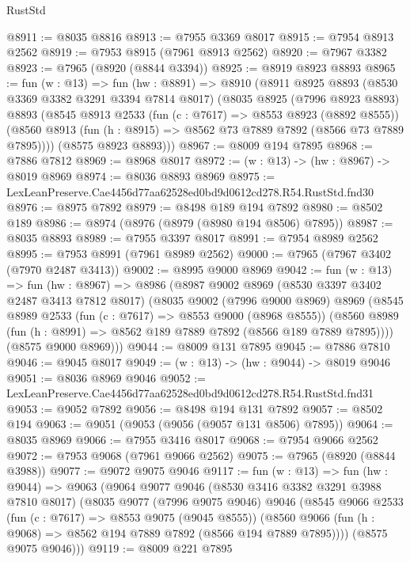 \begin{lexlean}{RustStd}
\begin{coremodule}
@8911 := @8035 @8816
@8913 := @7955 @3369 @8017
@8915 := @7954 @8913 @2562
@8919 := @7953 @8915 (@7961 @8913 @2562)
@8920 := @7967 @3382
@8923 := @7965 (@8920 (@8844 @3394))
@8925 := @8919 @8923 @8893
@8965 := fun (w : @13) =>
  fun (hw : @8891) =>
  @8910
    (@8911
      @8925
      @8893
      (@8530 @3369 @3382 @3291 @3394 @7814 @8017)
      (@8035
        @8925
        (@7996 @8923 @8893)
        @8893
        (@8545
          @8913
          @2533
          (fun (c : @7617) => @8553 @8923 (@8892 @8555))
          (@8560 @8913 (fun (h : @8915) => @8562 @73 @7889 @7892 (@8566 @73 @7889 @7895))))
        (@8575 @8923 @8893)))
@8967 := @8009 @194 @7895
@8968 := @7886 @7812
@8969 := @8968 @8017
@8972 := (w : @13) -> (hw : @8967) -> @8019 @8969
@8974 := @8036 @8893 @8969
@8975 := LexLeanPreserve.Cae4456d77aa62528ed0bd9d0612cd278.R54.RustStd.fnd30
@8976 := @8975 @7892
@8979 := @8498 @189 @194 @7892
@8980 := @8502 @189
@8986 := @8974 (@8976 (@8979 (@8980 @194 @8506) @7895))
@8987 := @8035 @8893
@8989 := @7955 @3397 @8017
@8991 := @7954 @8989 @2562
@8995 := @7953 @8991 (@7961 @8989 @2562)
@9000 := @7965 (@7967 @3402 (@7970 @2487 @3413))
@9002 := @8995 @9000 @8969
@9042 := fun (w : @13) =>
  fun (hw : @8967) =>
  @8986
    (@8987
      @9002
      @8969
      (@8530 @3397 @3402 @2487 @3413 @7812 @8017)
      (@8035
        @9002
        (@7996 @9000 @8969)
        @8969
        (@8545
          @8989
          @2533
          (fun (c : @7617) => @8553 @9000 (@8968 @8555))
          (@8560 @8989 (fun (h : @8991) => @8562 @189 @7889 @7892 (@8566 @189 @7889 @7895))))
        (@8575 @9000 @8969)))
@9044 := @8009 @131 @7895
@9045 := @7886 @7810
@9046 := @9045 @8017
@9049 := (w : @13) -> (hw : @9044) -> @8019 @9046
@9051 := @8036 @8969 @9046
@9052 := LexLeanPreserve.Cae4456d77aa62528ed0bd9d0612cd278.R54.RustStd.fnd31
@9053 := @9052 @7892
@9056 := @8498 @194 @131 @7892
@9057 := @8502 @194
@9063 := @9051 (@9053 (@9056 (@9057 @131 @8506) @7895))
@9064 := @8035 @8969
@9066 := @7955 @3416 @8017
@9068 := @7954 @9066 @2562
@9072 := @7953 @9068 (@7961 @9066 @2562)
@9075 := @7965 (@8920 (@8844 @3988))
@9077 := @9072 @9075 @9046
@9117 := fun (w : @13) =>
  fun (hw : @9044) =>
  @9063
    (@9064
      @9077
      @9046
      (@8530 @3416 @3382 @3291 @3988 @7810 @8017)
      (@8035
        @9077
        (@7996 @9075 @9046)
        @9046
        (@8545
          @9066
          @2533
          (fun (c : @7617) => @8553 @9075 (@9045 @8555))
          (@8560 @9066 (fun (h : @9068) => @8562 @194 @7889 @7892 (@8566 @194 @7889 @7895))))
        (@8575 @9075 @9046)))
@9119 := @8009 @221 @7895

\end{coremodule}
\end{lexlean}
